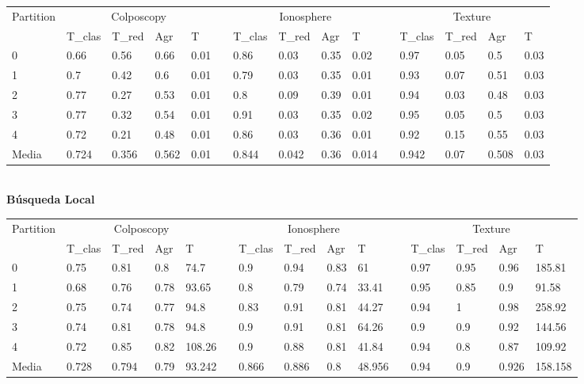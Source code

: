 \documentclass[11pt]{article}
\begin{document}
\hspace{-1cm}\begin{tabular}{lllllllllllllll}
Partition & \multicolumn{4}{c}{Colposcopy}  &  & \multicolumn{4}{c}{Ionosphere}  &  & \multicolumn{4}{c}{Texture}     \\
          & T\_clas & T\_red & Agr   & T    &  & T\_clas & T\_red & Agr  & T     &  & T\_clas & T\_red & Agr   & T    \\
0         & 0.66    & 0.56   & 0.66  & 0.01 &  & 0.86    & 0.03   & 0.35 & 0.02  &  & 0.97    & 0.05   & 0.5   & 0.03 \\
1         & 0.7     & 0.42   & 0.6   & 0.01 &  & 0.79    & 0.03   & 0.35 & 0.01  &  & 0.93    & 0.07   & 0.51  & 0.03 \\
2         & 0.77    & 0.27   & 0.53  & 0.01 &  & 0.8     & 0.09   & 0.39 & 0.01  &  & 0.94    & 0.03   & 0.48  & 0.03 \\
3         & 0.77    & 0.32   & 0.54  & 0.01 &  & 0.91    & 0.03   & 0.35 & 0.02  &  & 0.95    & 0.05   & 0.5   & 0.03 \\
4         & 0.72    & 0.21   & 0.48  & 0.01 &  & 0.86    & 0.03   & 0.36 & 0.01  &  & 0.92    & 0.15   & 0.55  & 0.03 \\
Media     & 0.724   & 0.356  & 0.562 & 0.01 &  & 0.844   & 0.042  & 0.36 & 0.014 &  & 0.942   & 0.07   & 0.508 & 0.03
\end{tabular}\\

\textbf{Búsqueda Local}\\

\hspace{-1.3cm}\begin{tabular}{lllllllllllllll}
Partition & \multicolumn{4}{c}{Colposcopy}   &  & \multicolumn{4}{c}{Ionosphere}   &  & \multicolumn{4}{c}{Texture}        \\
          & T\_clas & T\_red & Agr  & T      &  & T\_clas & T\_red & Agr  & T      &  & T\_clas & T\_red & Agr   & T       \\
0         & 0.75    & 0.81   & 0.8  & 74.7   &  & 0.9     & 0.94   & 0.83 & 61     &  & 0.97    & 0.95   & 0.96  & 185.81  \\
1         & 0.68    & 0.76   & 0.78 & 93.65  &  & 0.8     & 0.79   & 0.74 & 33.41  &  & 0.95    & 0.85   & 0.9   & 91.58   \\
2         & 0.75    & 0.74   & 0.77 & 94.8   &  & 0.83    & 0.91   & 0.81 & 44.27  &  & 0.94    & 1      & 0.98  & 258.92  \\
3         & 0.74    & 0.81   & 0.78 & 94.8   &  & 0.9     & 0.91   & 0.81 & 64.26  &  & 0.9     & 0.9    & 0.92  & 144.56  \\
4         & 0.72    & 0.85   & 0.82 & 108.26 &  & 0.9     & 0.88   & 0.81 & 41.84  &  & 0.94    & 0.8    & 0.87  & 109.92  \\
Media     & 0.728   & 0.794  & 0.79 & 93.242 &  & 0.866   & 0.886  & 0.8  & 48.956 &  & 0.94    & 0.9    & 0.926 & 158.158
\end{tabular}\\
\end{document}
